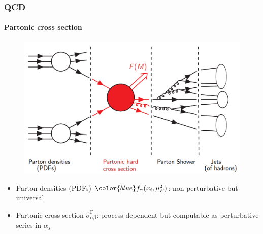 \documentclass[aspectratio=43]{beamer}
\begin{document}
\begin{frame}
	
	\frametitle{QCD}
	\framesubtitle{Partonic cross section}
	
	\begin{figure}
		\includegraphics[width = 7 cm]{plots/section1/factorization_2.png}
	\end{figure}
	
	\begin{itemize}
		\item Parton densities (PDFs) ${\color{blue} f_{\alpha}(x_{i}, \mu_{F}^{2})}$: non perturbative but universal
		\item Partonic cross section {\color{red}$\hat{\sigma}^{\textrm{F}}_{\alpha \beta}$}: process dependent but computable as perturbative series in $\alpha_{s}$
	\end{itemize}
	
\end{frame}
\end{document}
